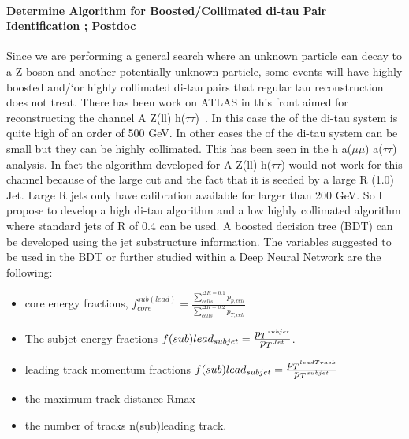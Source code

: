 \paragraph{Determine Algorithm for Boosted/Collimated di-tau Pair Identification ; Postdoc} %
Since we are performing a general search where an unknown particle can decay to a Z boson and another potentially unknown particle, some events will have highly boosted and/`or highly collimated di-tau pairs that regular
tau reconstruction does not treat.  There has been work on ATLAS in this front aimed for reconstructing the channel A \too Z(ll) h($\tau\tau$)~\cite{di-tau-thesis}.  In this case the \pt of the di-tau system is quite high of an order of 500 GeV.
In other cases the \pt of the di-tau system can be small but they can be highly collimated.  This has been seen in the h \too a($\mu \mu$) a($\tau \tau$) analysis.  In fact the algorithm developed for A \too Z(ll) h($\tau\tau$) would not 
work for this channel because of the large \pt cut and the fact that it is seeded by a large R (1.0) Jet.  Large R jets only have calibration available for \pt larger than 200 GeV.  So I propose to develop a high \pt di-tau
algorithm and a low \pt highly collimated algorithm where standard jets of R of 0.4 can be used. A boosted decision tree (BDT) can be developed using the jet substructure information.  
The variables suggested to be used in the BDT or further studied within a Deep Neural Network are the following:
\begin{itemize}
\item{core energy fractions, $f_{core}^{sub(lead)}=\frac{\sum_{cells}^{\Delta R=0.1} p_{p,cell}}{\sum_{cells}^{\Delta R=0.2}p_{T,cell}} $}
\item {The subjet energy fractions $f(sub)lead_{subjet}=\frac{\mbox{$p_T$}^{subjet}}{\mbox{$p_T$}^{Jet}}$. }
\item{leading track momentum fractions $f(sub)lead_{subjet}=\frac{\mbox{$p_T$} ^{leadTrack}}{\mbox{$p_T$}^{subjet}}$}
\item{the maximum track distance Rmax}
\item{the number of tracks n(sub)leading track.}
\end{itemize}

